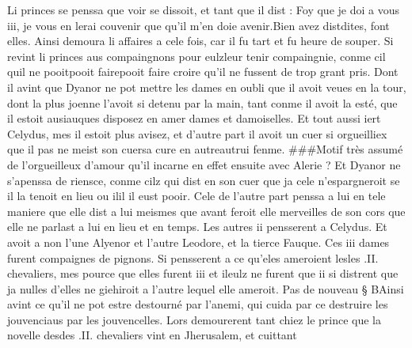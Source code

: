 \documentclass{article}
\begin{document}
\begin{pages}
   Li princes se penssa que voir se dissoit,
   et tant que il dist :
   Foy que je doi a vous iii, je vous en lerai couvenir que qu’il m’en doie avenir.Bien avez distdites, font elles. \pend
\pstart Ainsi demoura li affaires a cele fois, car il fu tart et 
   fu heure de souper. 
   Si revint li princes aus compaingnons pour 
   eulzleur tenir compaingnie, conme cil quil ne 
   pooitpooit fairepooit faire 
   croire qu’il ne fussent de trop grant pris. 
   Dont il avint que Dyanor ne pot mettre les dames en oubli que il avoit veues en 
   la tour, dont la plus joenne l’avoit si detenu 
   par la main, tant conme il avoit la esté, que il estoit 
   ausiauques disposez en amer dames et damoiselles. 
   Et tout aussi iert Celydus, mes il estoit plus avisez, et d’autre part il avoit un cuer 
   si orgueilliex que il pas ne meist 
   son cuersa cure en 
   autreautrui fenme. ###Motif très assumé
   de l'orgueilleux d'amour qu'il incarne en effet ensuite avec Alerie ? 
   Et Dyanor ne s’apenssa de riensce, 
   conme cilz qui dist en son cuer que ja cele n’espargneroit se il la tenoit en lieu ou 
      ilil il eust pooir. 
   Cele de l’autre part penssa a lui en tele maniere que elle dist a lui meismes que 
   avant feroit elle merveilles de son cors que elle ne parlast a lui en lieu et en temps. 
   Les autres ii pensserent a Celydus. Et avoit a non l’une 
   Alyenor et l’autre Leodore, 
   et la tierce Fauque. Ces iii dames furent compaignes de pignons. 
   Si pensserent a ce qu’eles ameroient 
      lesles .II. chevaliers, 
   mes pource que elles furent iii et ileulz ne furent que 
   ii si distrent que ja nulles d’elles ne giehiroit a l’autre lequel 
      elle ameroit. \pend
            \pstart Pas de nouveau § BAinsi avint ce qu’il ne pot estre destourné par l’anemi, 
   qui cuida par ce destruire les jouvenciaus par les jouvencelles. Lors demourerent tant chiez le prince 
   que la novelle desdes .II. chevaliers vint en 
   Jherusalem, et cuittant
               

\end{pages}
\end{document}
